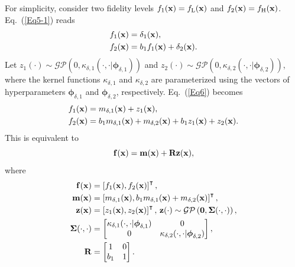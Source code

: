 \documentclass[iicol,sn-basic]{sn-jnl}%
\theoremstyle{thmstyleone}%
\theoremstyle{thmstyletwo}
\theoremstyle{thmstylethree}
\begin{document}
\begin{linenumbers}
For simplicity, consider two fidelity levels $f_{1}({\bf x})=f_\text{L}({\bf x})$ and $f_{2}({\bf x})=f_\text{H}({\bf x})$.
Eq.~(\ref{Eq5-1}) reads
\begin{subequations}\label{Eq6}
	\begin{align}
		f_1({\bf x}) & = \delta_1({\bf x}) 
		\label{Eq6-1},\\
		f_2({\bf x}) & = b_{1} f_{1}({\bf x}) + \delta_2({\bf x})
		\label{Eq6-2}.
	\end{align}
\end{subequations}
Let $z_1({\cdot}) \sim \mathcal{GP}\left(0,\kappa_{\delta,1}(\cdot,\cdot|{\boldsymbol \phi}_{\delta,1})\right)$ and $z_2({\cdot}) \sim \mathcal{GP}\left(0,\kappa_{\delta,2}(\cdot,\cdot|{\boldsymbol \phi}_{\delta,2})\right)$, where the kernel functions $\kappa_{\delta,1}$ and $\kappa_{\delta,2}$ are parameterized using the vectors of hyperparameters  ${\boldsymbol \phi}_{\delta,1}$ and ${\boldsymbol \phi}_{\delta,2}$, respectively.
Eq.~(\ref{Eq6}) becomes
\begin{subequations}\label{Eq7}
	\begin{align}
		f_1({\bf x}) & = m_{\delta,1}({\bf x}) + z_1({\bf x}) 
		\label{Eq7-1},\\
		f_2({\bf x}) & = b_1  m_{\delta,1}({\bf x}) + m_{\delta,2}({\bf x}) + b_1 z_1({\bf x}) + z_2({\bf x})
		\label{Eq7-2}.
	\end{align}
\end{subequations}
This is equivalent to
\begin{equation}\label{Eq8}
	{\bf f}({\bf x}) =  {\bf m}({\bf x}) + {\bf R} {\bf z}({\bf x}),
\end{equation}
where
\begin{subequations}\label{Eq9}
	\begin{align}
		{\bf f}({\bf x}) &= \left[f_1({\bf x}),f_2({\bf x})\right]^\intercal 
		\label{Eq9-1},\\
		{\bf m}({\bf x}) &= \left[m_{\delta,1}({\bf x}),b_1  m_{\delta,1}({\bf x}) + m_{\delta,2}({\bf x})\right]^\intercal
		\label{Eq9-2},\\
		{\bf z}({\bf x}) &= \left[z_1({\bf x}),z_2({\bf x})\right]^\intercal, \, {\bf z}(\cdot) \sim \mathcal{GP}\left({\bf 0},{\boldsymbol \Sigma}(\cdot,\cdot)\right)
		\label{Eq9-3},\\
		{\boldsymbol \Sigma}(\cdot,\cdot) &= \left[\begin{matrix}
			\kappa_{\delta,1}(\cdot,\cdot|{\boldsymbol \phi}_{\delta,1}) & 0 \\
			0 & \kappa_{\delta,2}(\cdot,\cdot|{\boldsymbol \phi}_{\delta,2})
		\end{matrix}\right],
		\label{Eq9-4}\\
	 	{\bf R} &= \left[\begin{matrix}
				1 & 0 \\
				b_1 & 1
				\end{matrix}\right]
		\label{Eq-5}.
	\end{align}
\end{subequations}


\end{linenumbers}
\end{document}
